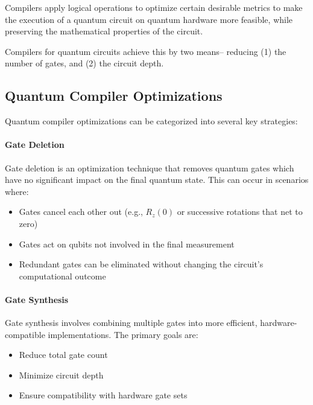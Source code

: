 Compilers apply logical operations to optimize certain desirable metrics to make
the execution of a quantum circuit on quantum hardware more feasible, while
preserving the mathematical properties of the circuit.

Compilers for quantum circuits achieve this by two means-- reducing (1) the
number of gates, and (2) the circuit depth.

\subsection*{Quantum Compiler Optimizations}

Quantum compiler optimizations can be categorized into several key strategies:

\paragraph{Gate Deletion}
Gate deletion is an optimization technique that removes quantum gates which
have no significant impact on the final quantum state. This can occur in
scenarios where:

\begin{itemize}
  \item Gates cancel each other out (e.g., $R_z(0)$ or successive rotations
    that net to zero)

  \item Gates act on qubits not involved in the final measurement

  \item Redundant gates can be eliminated without changing the circuit's
    computational outcome
\end{itemize}



\paragraph{Gate Synthesis}
Gate synthesis involves combining multiple gates into more efficient,
hardware-compatible implementations. The primary goals are:

\begin{itemize}
  \item Reduce total gate count

  \item Minimize circuit depth

  \item Ensure compatibility with hardware gate sets
\end{itemize}

